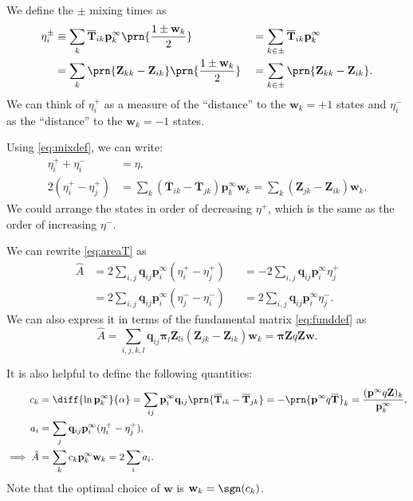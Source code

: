 \documentclass{article} %
\newcommand{\pr}{\mathbf{p}}
\newcommand{\eq}{\pr^\infty}
\newcommand{\fpt}{\mathbf{T}}
\newcommand{\fptb}{\overline{\fpt}}
\newcommand{\fund}{\mathbf{Z}}
\newcommand{\pib}{\boldsymbol{\pi}}
\newcommand{\w}{\mathbf{w}}
\newcommand{\enc}{\mathbf{q}}
\begin{document}
\begin{defn}
We define the $\pm$ mixing times as
%
\begin{equation}\label{eq:mixingpm}
\begin{aligned}
  \eta^\pm_i &\equiv \sum_k \fptb_{ik} \eq_k \prn{\frac{1 \pm \w_k}{2}}
    &&= \sum_{k\in\pm} \fptb_{ik} \eq_k \\
    &= \sum_k \prn{\fund_{kk}-\fund_{ik}} \prn{\frac{1 \pm \w_k}{2}}
    &&= \sum_{k\in\pm} \prn{\fund_{kk}-\fund_{ik}} .
\end{aligned}
\end{equation}
%
We can think of $\eta^+_i$ as a measure of the ``distance'' to the $\w_k=+1$ states and $\eta^-_i$ as the ``distance'' to the $\w_k=-1$ states.
\end{defn}
Using \eqref{eq:mixdef}, we can write:
%
\begin{equation}\label{eq:mixingrels}
\begin{aligned}
  \eta^+_i + \eta^-_i &= \eta,\\
  2(\eta^+_i - \eta^+_j) &= \sum_k (\fptb_{ik}-\fptb_{jk}) \eq_k \w_k
    = \sum_k (\fund_{jk}-\fund_{ik}) \w_k.
\end{aligned}
\end{equation}
%
We could arrange the states in order of decreasing $\eta^+$, which is the same as the order of increasing $\eta^-$.

We can rewrite \eqref{eq:areaT} as
%
\begin{equation}\label{eq:areaEta}
\begin{aligned}
  \hat{A} &= 2\sum_{i,j} \enc_{ij} \eq_i (\eta^+_{i} - \eta^+_{j}) &
    &= -2\sum_{i,j} \enc_{ij} \eq_i \eta^+_{j} \\
    &= 2\sum_{i,j} \enc_{ij} \eq_i (\eta^-_{j} - \eta^-_{i}) &
    &= 2\sum_{i,j} \enc_{ij} \eq_i \eta^-_{j}.
\end{aligned}
\end{equation}
%
We can also express it in terms of the fundamental matrix \eqref{eq:funddef} as
%
\begin{equation}\label{eq:areaZ}
  \hat{A} = \sum_{i,j,k,l} \enc_{ij} \pib_{l} \fund_{li} (\fund_{jk}-\fund_{ik}) \w_k
    = \pib \fund q \fund \w.
\end{equation}
%

It is also helpful to define the following quantities:
%
\begin{equation}\label{eq:areacoeffs}
  \begin{aligned}
    c_k &= \diff{\ln\eq_k}{\alpha}
      = \sum_{ij} \eq_i \enc_{ij} \prn{\fptb_{ik}-\fptb_{jk}}
      = - \prn{\eq q \fptb}_k
      = \frac{(\eq q \fund)_k}{\eq_k}, \\
    a_i &= \sum_j \enc_{ij} \eq_i (\eta^+_{i} - \eta^+_{j}),\\
    \implies
    \hat{A} &= \sum_k c_k \eq_k \w_k
      = 2\sum_i a_i.
  \end{aligned}
\end{equation}
%
Note that the optimal choice of $\w$ is $\w_k = \sgn(c_k)$.
\end{document}
